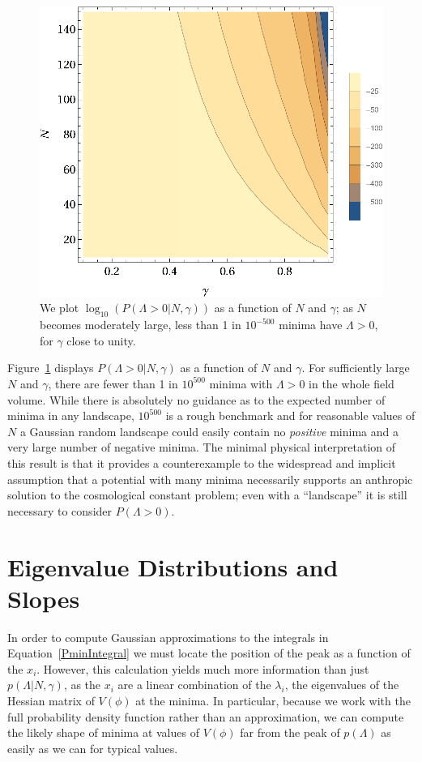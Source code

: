 \documentclass[12pt]{article}
\begin{document}
\begin{figure} 
  \centering
  \includegraphics[width=0.8 \linewidth]{histo.eps}
  \caption{We plot $\log_{10}(P(\Lambda>0|N,\gamma))$ as a function of $N$ and $\gamma$; as $N$ becomes moderately large, less than 1 in $10^{-500}$ minima have $\Lambda>0$, for $\gamma$  close to unity.}
  \label{fullcontourplot}
\end{figure}

 Figure~\ref{fullcontourplot} displays  $P(\Lambda >0 |N,\gamma)$ as a function of $N$ and $\gamma$. For sufficiently large $N$ and $\gamma$, there are fewer than 1 in $10^{500}$ minima with $\Lambda>0$ in the whole field volume. While there is absolutely no guidance as to the expected number of minima in any landscape, $10^{500}$ is a rough benchmark and for  reasonable values of $N$ a Gaussian random landscape could easily contain no {\em positive\/} minima and a very large number of negative minima.  The minimal physical interpretation of this result is that it provides a counterexample to the widespread and implicit assumption that a potential with many minima  necessarily supports an anthropic solution to the cosmological constant problem; even with a ``landscape'' it is still necessary to consider $P(\Lambda>0)$.    


\section{Eigenvalue Distributions and Slopes} 



In order to compute  Gaussian  approximations to the integrals in Equation~\ref{PminIntegral} we must locate the position of the peak as a function of the $x_i$. However, this calculation yields much more information than just $p(\Lambda  |N,\gamma)$, as the $x_i$ are a linear combination of the $\lambda_i$, the eigenvalues of the Hessian matrix of $V(\phi)$ at the minima. In particular, because we work with the full probability density function rather than an approximation, we can compute the likely shape of minima at values of $V(\phi)$ far from the peak of $p(\Lambda)$ as easily as we can for typical values.
\end{document}

